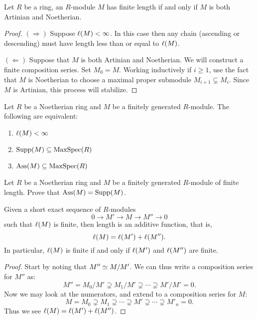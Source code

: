 \documentclass{ximera}
\begin{document}
\begin{corollary}
  Let $R$ be a ring, an $R$-module $M$ has finite length if and only
  if $M$ is both Artinian and Noetherian.
  \begin{proof}
    $(\Rightarrow)$ Suppose $\ell(M)<\infty$. In this case then any
    chain (ascending or descending) must have length less than or
    equal to $\ell(M)$.

    $(\Leftarrow)$ Suppose that $M$ is both Artinian and Noetherian.
    We will construct a finite composition series. Set $M_0 =
    M$. Working inductively if $i\ge 1$, use the fact that $M$ is
    Noetherian to choose a maximal proper submodule $M_{i+1}\subsetneq
    M_i$. Since $M$ is Artinian, this process will stabilize.
  \end{proof}
\end{corollary}



\begin{exercise}
  Let $R$ be a Noetherian ring and $M$ be a finitely generated
  $R$-module. The following are equivalent:
  \begin{enumerate}
  \item $\ell(M)<\infty$
  \item $\operatorname{Supp}(M)\subseteq\operatorname{MaxSpec}(R)$
  \item $\operatorname{Ass}(M)\subseteq\operatorname{MaxSpec}(R)$
  \end{enumerate}
\end{exercise}

\begin{exercise}
  Let $R$ be a Noetherian ring and $M$ be a finitely generated
  $R$-module of finite length. Prove that $\operatorname{Ass}(M) = \operatorname{Supp}(M)$.
\end{exercise}





\begin{proposition}
  Given a short exact sequence of $R$-modules
  \[
  0\to M' \to M\to M'' \to 0
  \]
  such that $\ell(M)$ is finite, then length is an additive function, that is,
  \[
  \ell(M) = \ell(M')+\ell(M'').
  \]
  In particular, $\ell(M)$ is finite if and only if $\ell(M')$ and
  $\ell(M'')$ are finite.
  \begin{proof}
    Start by noting that $M''\simeq M/M'$. We can thus write a
    composition series for $M''$ as:
    \[
    M'' = M_0/M' \supsetneq M_1/M' \supsetneq \cdots \supsetneq M'/M'  = 0.
    \]
    Now we may look at the numerators, and extend to a composition
    series for $M$:
    \[
    M = M_0 \supsetneq M_1 \supsetneq \cdots \supsetneq M' \supsetneq \cdots \supsetneq M'_n = 0.
    \]
    Thus we see $\ell(M) = \ell(M')+\ell(M'')$.
  \end{proof}
\end{proposition}
\end{document}
